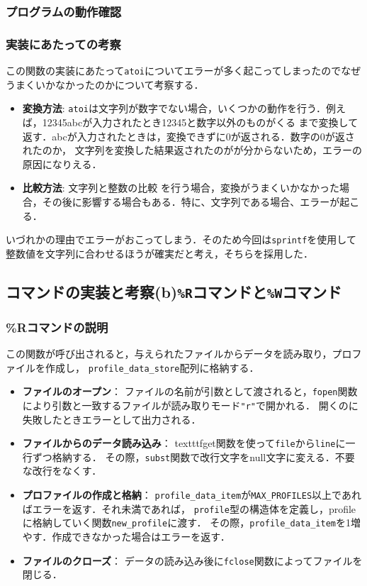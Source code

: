     \subsubsection{プログラムの動作確認}

    \subsubsection{実装にあたっての考察}
    この関数の実装にあたって\texttt{atoi}についてエラーが多く起こってしまったのでなぜうまくいかなかったのかについて考察する．
    \begin{itemize}
      \item \textbf{変換方法}:
        \texttt{atoi}は文字列が数字でない場合，いくつかの動作を行う．例えば，12345abcが入力されたとき12345と数字以外のものがくる
        まで変換して返す．abcが入力されたときは，変換できずに0が返される．数字の0が返されたのか，
        文字列を変換した結果返されたのがが分からないため，エラーの原因になりえる．
      \item \textbf{比較方法}:
        文字列と整数の比較
        を行う場合，変換がうまくいかなかった場合，その後に影響する場合もある．特に、文字列である場合、エラーが起こる．
    \end{itemize}
    いづれかの理由でエラーがおこってしまう．そのため今回は\texttt{sprintf}を使用して
    整数値を文字列に合わせるほうが確実だと考え，そちらを採用した．
\clearpage
  \subsection{コマンドの実装と考察(b)\texttt{\%R}コマンドと\texttt{\%W}コマンド}
    \subsubsection{\%Rコマンドの説明}
    この関数が呼び出されると，与えられたファイルからデータを読み取り，プロファイルを作成し，
    \texttt{profile\_data\_store}配列に格納する．
    \begin{itemize}
      \item\textbf{ファイルのオープン}：
      ファイルの名前が引数として渡されると，\texttt{fopen}関数により引数と一致するファイルが読み取りモード\texttt{"r"}で開かれる．
      開くのに失敗したときエラーとして出力される．
      \item\textbf{ファイルからのデータ読み込み}：
      texttt{fget}関数を使って\texttt{file}から\texttt{line}に一行ずつ格納する．
      その際，\texttt{subst}関数で改行文字をnull文字に変える．不要な改行をなくす．
      \item \textbf{プロファイルの作成と格納}：
      \texttt{profile\_data\_item}が\texttt{MAX\_PROFILES}以上であればエラーを返す．それ未満であれば，
      \texttt{profile}型の構造体を定義し，profileに格納していく関数\texttt{new\_profile}に渡す．
      その際，\texttt{profile\_data\_item}を1増やす．作成できなかった場合はエラーを返す．
      \item \textbf{ファイルのクローズ}：
      データの読み込み後に\texttt{fclose}関数によってファイルを閉じる．


    \end{itemize}
